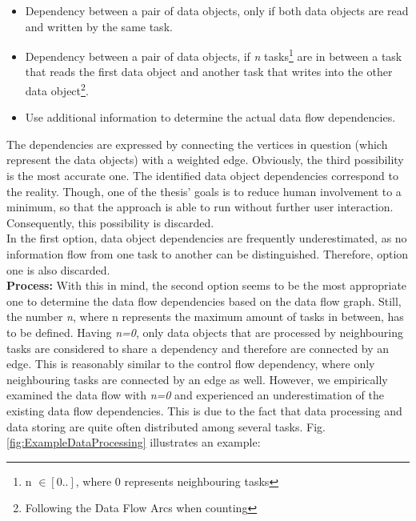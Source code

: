 \begin{itemize}
	\item Dependency between a pair of data objects, only if both data objects are read and written by the same task.
	\item Dependency between a pair of data objects, if \textit{n} tasks\footnote{n $\in [0..]$, where 0 represents neighbouring tasks} are in between a task that reads the first data object and another task that writes into the other data object\footnote{Following the Data Flow Arcs when counting}.

	\item Use additional information to determine the actual data flow dependencies.
\end{itemize}
\noindent
The dependencies are expressed by connecting the vertices in question (which represent the data objects) with a weighted edge. 
Obviously, the third possibility is the most accurate one. The identified data object dependencies correspond to the reality. Though, one of the thesis' goals is to reduce human involvement to a minimum, so that the approach is able to run without further user interaction. Consequently, this possibility is discarded. \\
In the first option, data object dependencies are frequently underestimated, as no information flow from one task to another can be distinguished. Therefore, option one is also discarded. \\

\noindent
\textbf{Process:} With this in mind, the second option seems to be the most appropriate one to determine the data flow dependencies based on the data flow graph. Still, the number \textit{n}, where n represents the maximum amount of tasks in between, has to be defined. Having \textit{n=0}, only data objects that are processed by neighbouring tasks are considered to share a dependency and therefore are connected by an edge. This is reasonably similar to the control flow dependency, where only neighbouring tasks are connected by an edge as well. However, we empirically examined the data flow with \textit{n=0} and experienced an underestimation of the existing data flow dependencies. This is due to the fact that data processing and data storing are quite often distributed among several tasks. Fig.\ref{fig:ExampleDataProcessing} illustrates an example: 


